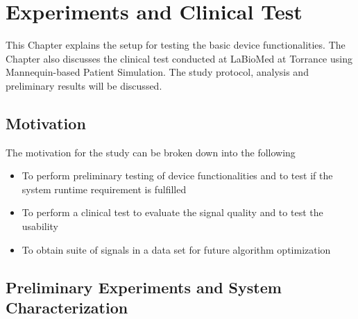 \chapter{Experiments and Clinical Test}
This Chapter explains the setup for testing the basic device functionalities. The Chapter also discusses the clinical test conducted at LaBioMed at Torrance using Mannequin-based Patient Simulation. The study protocol, analysis and preliminary results will be discussed.

\section{Motivation}
The motivation for the study can be broken down into the following
\begin{itemize}
	\item To perform preliminary testing of device functionalities and to test if the system runtime requirement is fulfilled
	
	\item To perform a clinical test to evaluate the signal quality and to test the usability
	
	\item To obtain suite of signals in a data set for future algorithm optimization
	 
\end{itemize}

\section{Preliminary Experiments and System Characterization}
